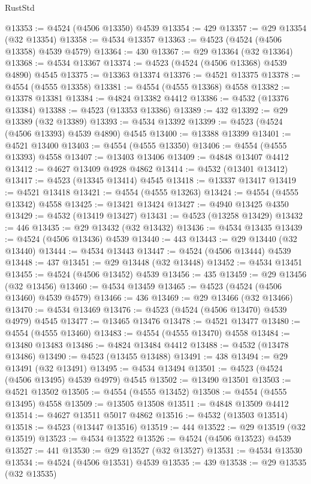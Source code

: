\begin{lexlean}{RustStd}
\begin{coremodule}
@13353 := @4524 (@4506 @13350) @4539
@13354 := 429
@13357 := @29 @13354 (@32 @13354)
@13358 := @4534 @13357
@13363 := @4523 (@4524 (@4506 @13358) @4539 @4579)
@13364 := 430
@13367 := @29 @13364 (@32 @13364)
@13368 := @4534 @13367
@13374 := @4523 (@4524 (@4506 @13368) @4539 @4890) @4545
@13375 := @13363 @13374
@13376 := @4521 @13375
@13378 := @4554 (@4555 @13358)
@13381 := @4554 (@4555 @13368) @4558
@13382 := @13378 @13381
@13384 := @4824 @13382 @4412
@13386 := @4532 (@13376 @13384)
@13388 := @4523 (@13353 @13386)
@13389 := 432
@13392 := @29 @13389 (@32 @13389)
@13393 := @4534 @13392
@13399 := @4523 (@4524 (@4506 @13393) @4539 @4890) @4545
@13400 := @13388 @13399
@13401 := @4521 @13400
@13403 := @4554 (@4555 @13350)
@13406 := @4554 (@4555 @13393) @4558
@13407 := @13403 @13406
@13409 := @4848 @13407 @4412
@13412 := @4627 @13409 @4928 @4862
@13414 := @4532 (@13401 @13412)
@13417 := @4523 (@13345 @13414) @4545
@13418 := @13337 @13417
@13419 := @4521 @13418
@13421 := @4554 (@4555 @13263)
@13424 := @4554 (@4555 @13342) @4558
@13425 := @13421 @13424
@13427 := @4940 @13425 @4350
@13429 := @4532 (@13419 @13427)
@13431 := @4523 (@13258 @13429)
@13432 := 446
@13435 := @29 @13432 (@32 @13432)
@13436 := @4534 @13435
@13439 := @4524 (@4506 @13436) @4539
@13440 := 443
@13443 := @29 @13440 (@32 @13440)
@13444 := @4534 @13443
@13447 := @4524 (@4506 @13444) @4539
@13448 := 437
@13451 := @29 @13448 (@32 @13448)
@13452 := @4534 @13451
@13455 := @4524 (@4506 @13452) @4539
@13456 := 435
@13459 := @29 @13456 (@32 @13456)
@13460 := @4534 @13459
@13465 := @4523 (@4524 (@4506 @13460) @4539 @4579)
@13466 := 436
@13469 := @29 @13466 (@32 @13466)
@13470 := @4534 @13469
@13476 := @4523 (@4524 (@4506 @13470) @4539 @4979) @4545
@13477 := @13465 @13476
@13478 := @4521 @13477
@13480 := @4554 (@4555 @13460)
@13483 := @4554 (@4555 @13470) @4558
@13484 := @13480 @13483
@13486 := @4824 @13484 @4412
@13488 := @4532 (@13478 @13486)
@13490 := @4523 (@13455 @13488)
@13491 := 438
@13494 := @29 @13491 (@32 @13491)
@13495 := @4534 @13494
@13501 := @4523 (@4524 (@4506 @13495) @4539 @4979) @4545
@13502 := @13490 @13501
@13503 := @4521 @13502
@13505 := @4554 (@4555 @13452)
@13508 := @4554 (@4555 @13495) @4558
@13509 := @13505 @13508
@13511 := @4848 @13509 @4412
@13514 := @4627 @13511 @5017 @4862
@13516 := @4532 (@13503 @13514)
@13518 := @4523 (@13447 @13516)
@13519 := 444
@13522 := @29 @13519 (@32 @13519)
@13523 := @4534 @13522
@13526 := @4524 (@4506 @13523) @4539
@13527 := 441
@13530 := @29 @13527 (@32 @13527)
@13531 := @4534 @13530
@13534 := @4524 (@4506 @13531) @4539
@13535 := 439
@13538 := @29 @13535 (@32 @13535)

\end{coremodule}
\end{lexlean}
